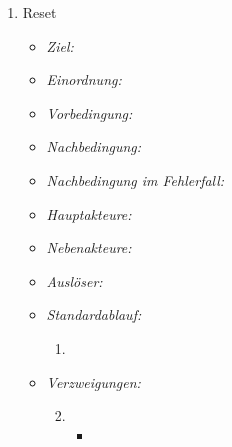 \begin{enumerate}
\item Reset
  \begin{itemize}
  \item \textit{Ziel:} 
  \item \textit{Einordnung:} 
  \item \textit{Vorbedingung:} 
  \item \textit{Nachbedingung:} 
  \item \textit{Nachbedingung im Fehlerfall:} 
  \item \textit{Hauptakteure:}
  \item \textit{Nebenakteure:}
  \item \textit{Ausl\"oser:}
  \item \textit{Standardablauf:}
    \begin{enumerate}[label=(\arabic*)]
    \item 
    \end{enumerate}
  \item \textit{Verzweigungen:}
    \begin{enumerate}[label=(\arabic*a)]
    \setcounter{enumii}{1}
    \item 
      \begin{itemize}
      \item 
      \end{itemize}
    \end{enumerate}
  \end{itemize}
\end{enumerate}
